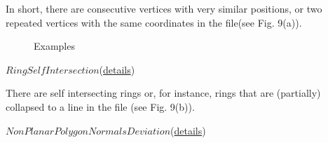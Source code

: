\documentclass[12pt]{article}
\begin{document}
In short, there are consecutive vertices with very similar positions, or two repeated vertices with the same coordinates in the file(see Fig. 9(a)).
\begin{figure}[htbp]
\centering
{}
\caption{Examples}
\end{figure}

$Ring Self Intersection$(\href{https://val3dity.readthedocs.io/en/latest/errors/#ring-self-intersection}{details})

There are self intersecting rings or, for instance, rings that are (partially) collapsed to a line in the file (see Fig. 9(b)).

$Non Planar Polygon Normals Deviation$(\href{https://val3dity.readthedocs.io/en/latest/errors/#non-planar-polygon-normals-deviation}{details})
\end{document}
